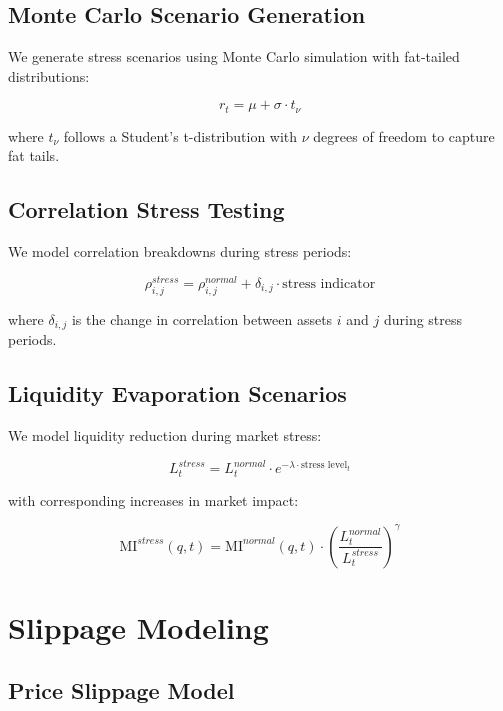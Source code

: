 \documentclass{article}
\begin{document}
\subsection{Monte Carlo Scenario Generation}

We generate stress scenarios using Monte Carlo simulation with fat-tailed distributions:

\begin{equation}
r_t = \mu + \sigma \cdot t_{\nu}
\end{equation}

where $t_{\nu}$ follows a Student's t-distribution with $\nu$ degrees of freedom to capture fat tails.

\subsection{Correlation Stress Testing}

We model correlation breakdowns during stress periods:

\begin{equation}
\rho^{stress}_{i,j} = \rho^{normal}_{i,j} + \delta_{i,j} \cdot \text{stress indicator}
\end{equation}

where $\delta_{i,j}$ is the change in correlation between assets $i$ and $j$ during stress periods.

\subsection{Liquidity Evaporation Scenarios}

We model liquidity reduction during market stress:

\begin{equation}
L^{stress}_t = L^{normal}_t \cdot e^{-\lambda \cdot \text{stress level}_t}
\end{equation}

with corresponding increases in market impact:

\begin{equation}
\text{MI}^{stress}(q, t) = \text{MI}^{normal}(q, t) \cdot \left(\frac{L^{normal}_t}{L^{stress}_t}\right)^{\gamma}
\end{equation}

\section{Slippage Modeling}

\subsection{Price Slippage Model}
\end{document}
